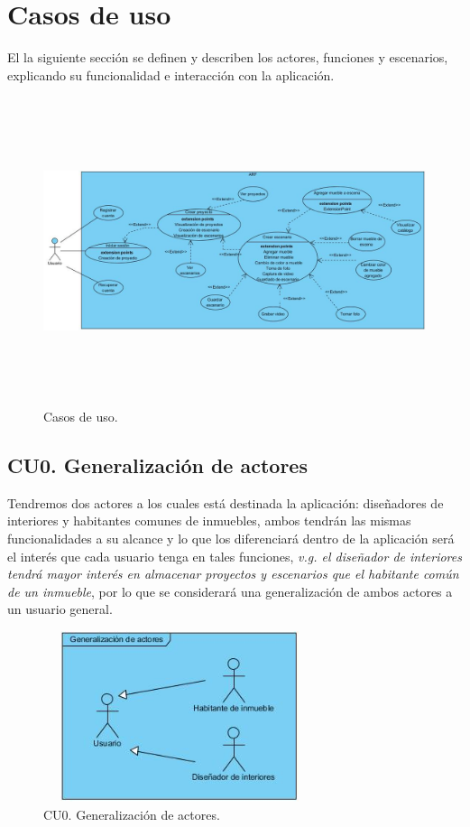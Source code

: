 
\newpage
\section{Casos de uso}
El la siguiente sección se definen y describen los actores, funciones y escenarios, explicando su funcionalidad e interacción con la aplicación.\par
\vspace{5mm}
\begin{figure}[h!]
	\centering
	\includegraphics[width=17cm,height=9cm]{imagenes/analisis/cu/cu_complete.jpg}
	\caption{Casos de uso.}
	\label{fig:casosdeuso}
\end{figure}  
\newpage

\subsection{CU0. Generalización de actores}\par
Tendremos dos actores a los cuales está destinada la aplicación: diseñadores de interiores y habitantes comunes de inmuebles, ambos tendrán las mismas funcionalidades a su alcance y lo que los diferenciará dentro de la aplicación será el interés que cada usuario tenga en tales funciones, \textit{v.g. el diseñador de interiores tendrá mayor interés en almacenar proyectos y escenarios que el habitante común de un inmueble}, por lo que se considerará una generalización de ambos actores a un usuario general.

\begin{figure}[h!]
	\centering
	\includegraphics[width=8cm,height=5cm]{imagenes/analisis/cu/generalizacion.jpg}
	\caption{CU0. Generalización de actores.}
	\label{fig:generalizacionactores}
\end{figure} 


